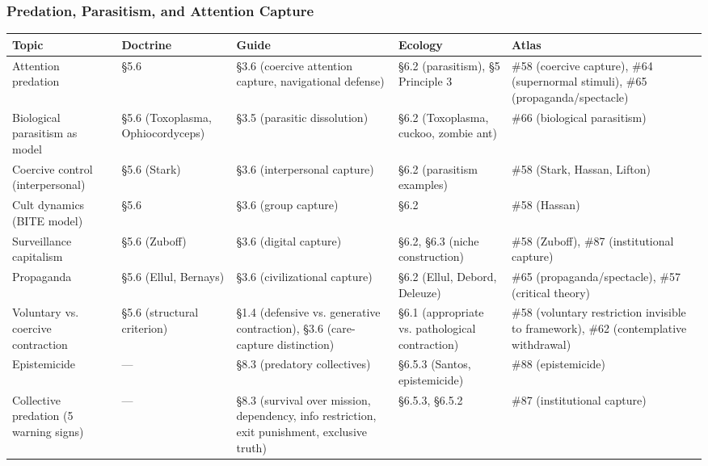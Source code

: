 \subsubsection*{Predation, Parasitism, and Attention Capture}



{\small
\begin{longtable}{>{\raggedright\arraybackslash}p{} >{\raggedright\arraybackslash}p{} >{\raggedright\arraybackslash}p{} >{\raggedright\arraybackslash}p{} >{\raggedright\arraybackslash}p{}}
\toprule
\textbf{Topic} & \textbf{Doctrine} & \textbf{Guide} & \textbf{Ecology} & \textbf{Atlas} \\
\midrule
\endhead
Attention predation & §5.6 & §3.6 (coercive attention capture, navigational defense) & §6.2 (parasitism), §5 Principle 3 & \#58 (coercive capture), \#64 (supernormal stimuli), \#65 (propaganda/\allowbreak spectacle) \\
Biological parasitism as model & §5.6 (Toxoplasma, Ophiocordyceps) & §3.5 (parasitic dissolution) & §6.2 (Toxoplasma, cuckoo, zombie ant) & \#66 (biological parasitism) \\
Coercive control (interpersonal) & §5.6 (Stark) & §3.6 (interpersonal capture) & §6.2 (parasitism examples) & \#58 (Stark, Hassan, Lifton) \\
Cult dynamics (BITE model) & §5.6 & §3.6 (group capture) & §6.2 & \#58 (Hassan) \\
Surveillance capitalism & §5.6 (Zuboff) & §3.6 (digital capture) & §6.2, §6.3 (niche construction) & \#58 (Zuboff), \#87 (institutional capture) \\
Propaganda & §5.6 (Ellul, Bernays) & §3.6 (civilizational capture) & §6.2 (Ellul, Debord, Deleuze) & \#65 (propaganda/\allowbreak spectacle), \#57 (critical theory) \\
Voluntary vs. coercive contraction & §5.6 (structural criterion) & §1.4 (defensive vs. generative contraction), §3.6 (care-capture distinction) & §6.1 (appropriate vs. pathological contraction) & \#58 (voluntary restriction invisible to framework), \#62 (contemplative withdrawal) \\
Epistemicide & — & §8.3 (predatory collectives) & §6.5.3 (Santos, epistemicide) & \#88 (epistemicide) \\
Collective predation (5 warning signs) & — & §8.3 (survival over mission, dependency, info restriction, exit punishment, exclusive truth) & §6.5.3, §6.5.2 & \#87 (institutional capture) \\
\bottomrule
\end{longtable}
}



